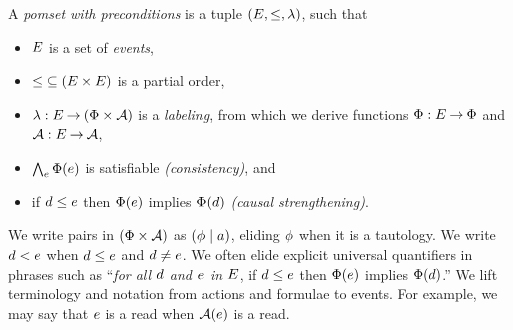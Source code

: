 \begin{definition}
  \label{def:mmpomset}
  A \emph{pomset with preconditions} is a tuple
  $(\Event, {\le}, %
  \labeling)$, such that
  \begin{itemize}
  \item $E$ is a set of \emph{events},
  \item ${\le} \subseteq (E\times E)$ is a partial order, 
  \item $\lambda: E \mathbin\rightarrow (\Phi\times\mathcal{A})$ is a \emph{labeling},
    from which we derive functions $\Phi:E\mathbin\rightarrow\Phi$ and $\mathcal{A}:E\mathbin\rightarrow\mathcal{A}$,
  \item $\bigwedge_{e}\Phi(e)$ is satisfiable
    \emph{(consistency)}, and
  \item if $d\le e$ then $\Phi(e)$ implies
    $\Phi(d)$ \emph{(causal strengthening)}.
  \end{itemize}
\end{definition}


We write pairs in $(\Phi\times\mathcal{A})$ as $(\phi \mid a)$, eliding
$\phi$ when it is a tautology.
%
We write $d<e$ when $d\le e$ and $d\neq e$.
%
We often elide explicit universal quantifiers in phrases such as ``\emph{for
  all $d$ and $e$ in $E$}, if $d\le e$ then
$\Phi(e)$ implies $\Phi(d)$.''  We lift terminology
and notation from actions and formulae to events.  For example, we may say
that $e$ is a read when $\mathcal{A}(e)$ is a read.

